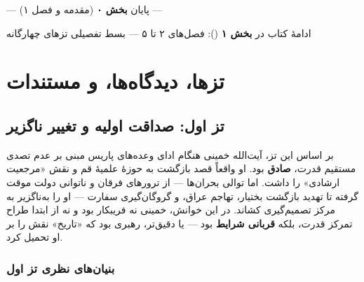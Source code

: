 \documentclass[12pt,a4paper]{book}
\newcommand{\keyword}[1]{\textbf{\textcolor{cPrimary}{#1}}}
\newcommand{\en}[1]{\lr{\textit{#1}}}
\begin{document}
\vspace{1cm}

\begin{center}

\vspace{0.5cm}
{\small\color{cGray} — پایان \textbf{بخش ۰} (مقدمه و فصل ۱) —}

\vspace{0.3cm}
{\small\color{cGray} ادامهٔ کتاب در \textbf{بخش ۱} (\en{Segment 1}): فصل‌های ۲ تا ۵ — بسط تفصیلی تزهای چهارگانه}
\end{center}


\part{تزها، دیدگاه‌ها، و مستندات}

\chapter{تز اول: صداقت اولیه و تغییر ناگزیر}

\begin{infoBox}
بر اساس این تز، آیت‌الله خمینی هنگام ادای وعده‌های پاریس مبنی بر عدم تصدی مستقیم قدرت، \keyword{صادق} بود. او واقعاً قصد بازگشت به حوزهٔ علمیهٔ قم و نقش «مرجعیت ارشادی» را داشت. اما توالی بحران‌ها — از ترورهای فرقان و ناتوانی دولت موقت گرفته تا تهدید بازگشت بختیار، تهاجم عراق، و گروگان‌گیری سفارت — او را به‌ناگزیر به مرکز تصمیم‌گیری کشاند. در این خوانش، خمینی نه فریبکار بود و نه از ابتدا طراح تمرکز قدرت، بلکه \keyword{قربانی شرایط} بود — یا دقیق‌تر، رهبری بود که «تاریخ» نقش را بر او تحمیل کرد.
\end{infoBox}

\section{بنیان‌های نظری تز اول}
\end{document}
